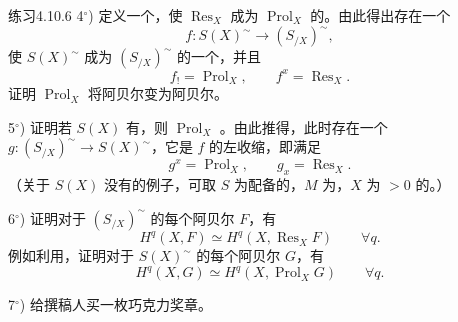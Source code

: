 \begin{SGAresult}{练习}{4.10.6}
 4$^\circ$) 定义一个，使 $\operatorname{Res}_X$ 成为 $\operatorname{Prol}_X$ 的。由此得出存在一个
\[
 f:S(X)^\sim\longrightarrow(S_{/X})^\sim,
\]
使 $S(X)^\sim$ 成为 $(S_{/X})^\sim$ 的一个，并且
\[
 f_!=\operatorname{Prol}_X,\qquad f^x=\operatorname{Res}_X.
\]
证明 $\operatorname{Prol}_X$ 将阿贝尔变为阿贝尔。

 5$^\circ$) 证明若 $S(X)$ 有，则 $\operatorname{Prol}_X$ 。由此推得，此时存在一个 $g:(S_{/X})^\sim\to S(X)^\sim$，它是 $f$ 的左收缩，即满足
\[
 g^x=\operatorname{Prol}_X,\qquad g_x=\operatorname{Res}_X.
\]
（关于 $S(X)$ 没有的例子，可取 $S$ 为配备的，$M$ 为，$X$ 为 $>0$ 的。）

 6$^\circ$) 证明对于 $(S_{/X})^\sim$ 的每个阿贝尔 $F$，有
\[
 H^q(X,F)\simeq H^q(X,\operatorname{Res}_X F)\qquad\forall q.
\]
例如利用，证明对于 $S(X)^\sim$ 的每个阿贝尔 $G$，有
\[
 H^q(X,G)\simeq H^q(X,\operatorname{Prol}_X G)\qquad\forall q.
\]

 7$^\circ$) 给撰稿人买一枚巧克力奖章。
\end{SGAresult}
